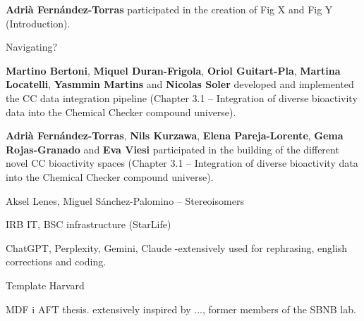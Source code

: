 

\textbf{Adrià Fernández-Torras} participated in the creation of Fig X and Fig Y (Introduction).

Navigating?

\textbf{Martino Bertoni}, \textbf{Miquel Duran-Frigola}, \textbf{Oriol Guitart-Pla}, \textbf{Martina Locatelli}, \textbf{Yasmmin Martins} and \textbf{Nicolas Soler} developed and implemented the CC data integration pipeline (Chapter 3.1 -- Integration of diverse bioactivity data into the Chemical Checker compound universe).

\textbf{Adrià Fernández-Torras}, \textbf{Nils Kurzawa}, \textbf{Elena Pareja-Lorente}, \textbf{Gema Rojas-Granado} and \textbf{Eva Viesi} participated in the building of the different novel CC bioactivity spaces (Chapter 3.1 -- Integration of diverse bioactivity data into the Chemical Checker compound universe).


Aksel Lenes, Miguel Sánchez-Palomino -- Stereoisomers



IRB IT, BSC infrastructure (StarLife)


ChatGPT, Perplexity, Gemini, Claude -extensively used for rephrasing, english corrections and coding. 


Template Harvard

MDF i AFT thesis. extensively inspired by ..., former members of the SBNB lab. 